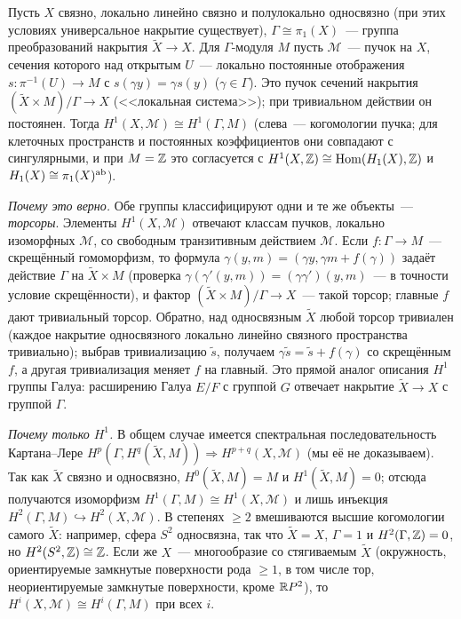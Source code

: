 \begin{aside}
Пусть $X$ связно, локально линейно связно и полулокально односвязно (при этих условиях универсальное накрытие
существует), $\Gamma\cong\pi_1(X)$~--- группа преобразований накрытия $\tilde X\to X$. Для $\Gamma$-модуля $M$ пусть
$\mathcal M$~--- пучок на $X$, сечения которого над открытым $U$~--- локально постоянные отображения
$s\colon\pi^{-1}(U)\to M$ с $s(\gamma y)=\gamma s(y)$ ($\gamma\in\Gamma$). Это пучок сечений накрытия
$(\tilde X\times M)/\Gamma\to X$ (<<локальная система>>); при тривиальном действии он постоянен. Тогда
$H^1(X,\mathcal M)\cong H^1(\Gamma,M)$ (слева~--- когомологии пучка; для клеточных пространств и постоянных
коэффициентов они совпадают с сингулярными, и при $M=\mathbb Z$ это согласуется с $H^1(X,\mathbb Z)\cong\operatorname{Hom}(H_1(X),\mathbb Z)$ и
$H_1(X)\cong\pi_1(X)^{\rm ab}$).

\emph{Почему это верно.} Обе группы классифицируют одни и те же объекты~--- \emph{торсоры}. Элементы $H^1(X,\mathcal M)$
отвечают классам пучков, локально изоморфных $\mathcal M$, со свободным транзитивным действием $\mathcal M$. Если
$f\colon\Gamma\to M$~--- скрещённый гомоморфизм, то формула $\gamma(y,m)=(\gamma y,\gamma m+f(\gamma))$ задаёт действие
$\Gamma$ на $\tilde X\times M$ (проверка $\gamma(\gamma'(y,m))=(\gamma\gamma')(y,m)$~--- в точности условие скрещённости),
и фактор $(\tilde X\times M)/\Gamma\to X$~--- такой торсор; главные $f$ дают тривиальный торсор. Обратно, над односвязным
$\tilde X$ любой торсор тривиален (каждое накрытие односвязного локально линейно связного пространства тривиально);
выбрав тривиализацию $\tilde s$, получаем $\gamma\tilde s=\tilde s+f(\gamma)$ со скрещённым $f$, а другая тривиализация
меняет $f$ на главный. Это прямой аналог описания $H^1$ группы Галуа: расширению Галуа $E/F$ с группой $G$ отвечает
накрытие $\tilde X\to X$ с группой $\Gamma$.

\emph{Почему только $H^1$.} В общем случае имеется спектральная последовательность Картана--Лере
$H^p(\Gamma,H^q(\tilde X,M))\Rightarrow H^{p+q}(X,\mathcal M)$ (мы её не доказываем). Так как $\tilde X$ связно и
односвязно, $H^0(\tilde X,M)=M$ и $H^1(\tilde X,M)=0$; отсюда получаются изоморфизм $H^1(\Gamma,M)\cong H^1(X,\mathcal M)$
и лишь инъекция $H^2(\Gamma,M)\hookrightarrow H^2(X,\mathcal M)$. В степенях $\ge2$ вмешиваются высшие когомологии самого
$\tilde X$: например, сфера $S^2$ односвязна, так что $\tilde X=X$, $\Gamma=1$ и $H^2(\Gamma,\mathbb Z)=0$, но
$H^2(S^2,\mathbb Z)\cong\mathbb Z$. Если же $X$~--- многообразие со стягиваемым $\tilde X$ (окружность, ориентируемые замкнутые
поверхности рода $\ge1$, в том числе тор, неориентируемые замкнутые поверхности, кроме $\mathbb R P^2$), то
$H^i(X,\mathcal M)\cong H^i(\Gamma,M)$ при всех $i$.
\end{aside}

